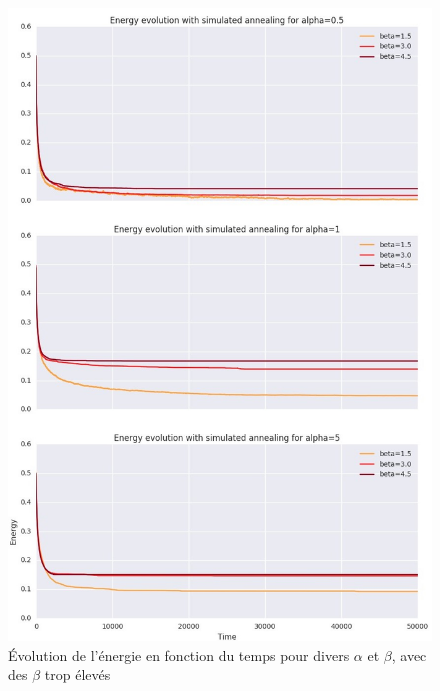 \documentclass[twocolumn]{article}
\begin{document}
\begin{figure}
	\includegraphics[width=\columnwidth]{../tobekept/skype_2.jpg}
	\caption{Évolution de l'énergie en fonction du temps pour divers $\alpha$ et $\beta$, avec des $\beta$ trop élevés}
\end{figure}
\end{document}
